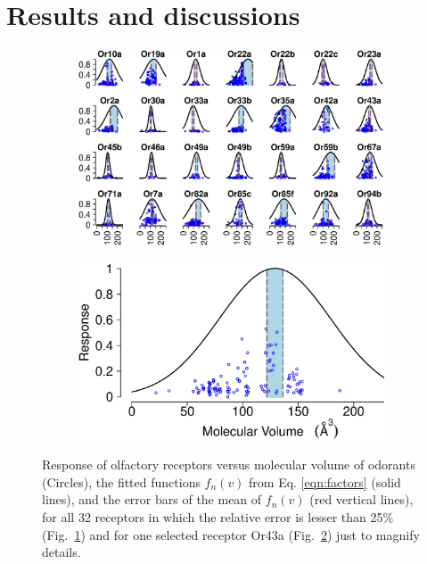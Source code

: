 \documentclass[11pt]{paper} %
\newcommand{\numberofreceptors}{32 }
\begin{document}
\section{Results and discussions}
\begin{figure}
	\centering
	\begin{subfigure}[b]{\textwidth}
		\includegraphics[width=\textwidth]{fig/vol-res}
		\caption{}
		\label{fig:vol-res:all}		
	\end{subfigure}
	\begin{subfigure}[b]{0.75 \textwidth}
		\includegraphics[width= \textwidth]{fig/vol-res-Or43a}
		\caption{}	
		\label{fig:vol-res:one}	
	\end{subfigure}
	\caption{Response of olfactory receptors  versus molecular volume of odorants (Circles), the fitted functions $f_n(v)$ from Eq. 			\ref{eqn:factors} (solid lines), 
		and the error bars of the mean of $f_n(v)$ (red vertical lines),
		for all \numberofreceptors receptors in which the relative error is lesser than 25\% (Fig.~\ref{fig:vol-res:all}) and for one selected receptor Or43a (Fig.~\ref{fig:vol-res:one}) just to magnify details. }
	\label{fig:vol-res}
\end{figure}
\end{document}
